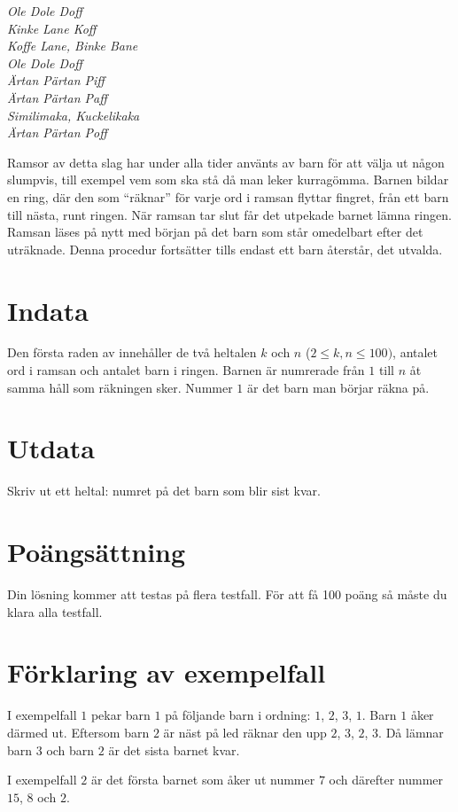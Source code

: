 

{\em
Ole Dole Doff\\ 
Kinke Lane Koff\\ 
Koffe Lane, Binke Bane\\ 
Ole Dole Doff \\
Ärtan Pärtan Piff\\
Ärtan Pärtan Paff \\
Similimaka, Kuckelikaka\\ 
Ärtan Pärtan Poff
}

Ramsor av detta slag har under alla tider använts av barn för att välja ut någon slumpvis, till
exempel vem som ska stå då man leker kurragömma. Barnen bildar en ring, där den som ``räknar''
för varje ord i ramsan flyttar fingret, från ett barn till nästa, runt ringen. När ramsan
tar slut får det utpekade barnet lämna ringen. Ramsan läses på nytt med början på det barn som
står omedelbart efter det uträknade. Denna procedur fortsätter tills endast ett barn återstår, det utvalda.

\section*{Indata}
Den första raden av innehåller de två heltalen $k$ och $n$ ($2 \leq k,n \leq 100)$, antalet ord
i ramsan och antalet barn i ringen. Barnen är numrerade från $1$ till $n$ åt samma håll som räkningen
sker. Nummer $1$ är det barn man börjar räkna på.

\section*{Utdata}
Skriv ut ett heltal: numret på det barn som blir sist kvar.

\section*{Poängsättning}
Din lösning kommer att testas på flera testfall. För att få 100 poäng så måste du klara alla testfall.

\section*{Förklaring av exempelfall}
I exempelfall $1$ pekar barn $1$ på följande barn i ordning: $1$, $2$, $3$, $1$. Barn $1$ åker därmed ut.
Eftersom barn $2$ är näst på led räknar den upp $2$, $3$, $2$, $3$. Då lämnar barn $3$ och barn $2$ är
det sista barnet kvar.

I exempelfall $2$ är det första barnet som åker ut nummer $7$ och därefter nummer $15$, $8$ och $2$.
